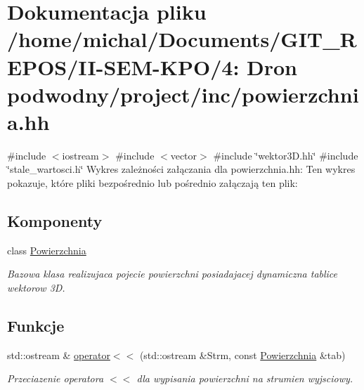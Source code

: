 \hypertarget{powierzchnia_8hh}{}\section{Dokumentacja pliku /home/michal/\+Documents/\+G\+I\+T\+\_\+\+R\+E\+P\+O\+S/\+I\+I-\/\+S\+E\+M-\/\+K\+P\+O/4\+: Dron podwodny/project/inc/powierzchnia.hh}
\label{powierzchnia_8hh}
{\ttfamily \#include $<$iostream$>$}\newline
{\ttfamily \#include $<$vector$>$}\newline
{\ttfamily \#include \char`\"{}wektor3\+D.\+hh\char`\"{}}\newline
{\ttfamily \#include \char`\"{}stale\+\_\+wartosci.\+h\char`\"{}}\newline
Wykres zależności załączania dla powierzchnia.\+hh\+:
Ten wykres pokazuje, które pliki bezpośrednio lub pośrednio załączają ten plik\+:
\subsection*{Komponenty}
\begin{DoxyCompactItemize}
\item 
class \hyperlink{class_powierzchnia}{Powierzchnia}
\begin{DoxyCompactList}\small\item\em Bazowa klasa realizujaca pojecie powierzchni posiadajacej dynamiczna tablice wektorow 3D. \end{DoxyCompactList}\end{DoxyCompactItemize}
\subsection*{Funkcje}
\begin{DoxyCompactItemize}
\item 
std\+::ostream \& \hyperlink{powierzchnia_8hh_a96e1f55244bb867a29249eee1ea1e4f6}{operator$<$$<$} (std\+::ostream \&Strm, const \hyperlink{class_powierzchnia}{Powierzchnia} \&tab)
\begin{DoxyCompactList}\small\item\em Przeciazenie operatora $<$$<$ dla wypisania powierzchni na strumien wyjsciowy. \end{DoxyCompactList}\end{DoxyCompactItemize}


